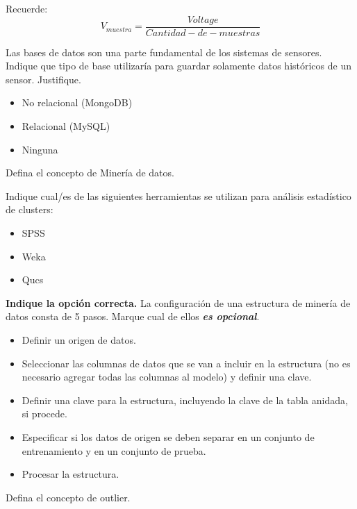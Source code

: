 \documentclass[11pt]{exam}
\begin{document}
\begin{questions}
Recuerde: 
$$V_{muestra} = \frac{Voltage}{Cantidad-de-muestras}$$

\newpage

\addpoints
\question[1] Las bases de datos son una parte fundamental de los sistemas de sensores. Indique que tipo de base utilizaría para guardar solamente datos históricos de un sensor. Justifique.
\begin{itemize}
\item No relacional (MongoDB)
\item Relacional (MySQL)
\item Ninguna
\end{itemize}

\addpoints
\question[1] Defina el concepto de Minería de datos.
\vspace{1in}

\addpoints
\question[1] Indique cual/es de las siguientes herramientas se utilizan para análisis estadístico de clusters:
\begin{itemize}
\item SPSS
\item Weka
\item Qucs
\end{itemize}


\addpoints
\question[1] \textbf{Indique la opción correcta.} La configuración de una estructura de minería de datos consta de 5 pasos. Marque cual de ellos \textit{\textbf{es opcional}}.

\begin{itemize}
\item Definir un origen de datos.
\item Seleccionar las columnas de datos que se van a incluir en la estructura (no es necesario agregar todas las columnas al modelo) y definir una clave.
\item Definir una clave para la estructura, incluyendo la clave de la tabla anidada, si procede.
\item Especificar si los datos de origen se deben separar en un conjunto de entrenamiento y en un conjunto de prueba.
\item Procesar la estructura.
\end{itemize}

\addpoints
\question[1] Defina el concepto de outlier.
\vspace{1in}

\end{questions}
\end{document}
